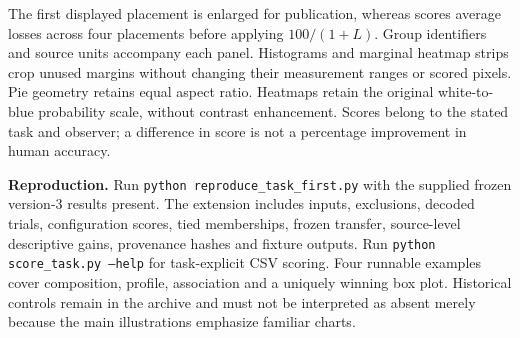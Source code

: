 \documentclass[10pt]{article}
\begin{document}


The first displayed placement is enlarged for publication, whereas scores average losses across four placements before applying $100/(1+L)$. Group identifiers and source units accompany each panel. Histograms and marginal heatmap strips crop unused margins without changing their measurement ranges or scored pixels. Pie geometry retains equal aspect ratio. Heatmaps retain the original white-to-blue probability scale, without contrast enhancement. Scores belong to the stated task and observer; a difference in score is not a percentage improvement in human accuracy.

\textbf{Reproduction.} Run \texttt{python reproduce\_task\_first.py} with the supplied frozen version-3 results present. The extension includes inputs, exclusions, decoded trials, configuration scores, tied memberships, frozen transfer, source-level descriptive gains, provenance hashes and fixture outputs. Run \texttt{python score\_task.py --help} for task-explicit CSV scoring. Four runnable examples cover composition, profile, association and a uniquely winning box plot. Historical controls remain in the archive and must not be interpreted as absent merely because the main illustrations emphasize familiar charts.

\begingroup\footnotesize\endgroup
\end{document}
